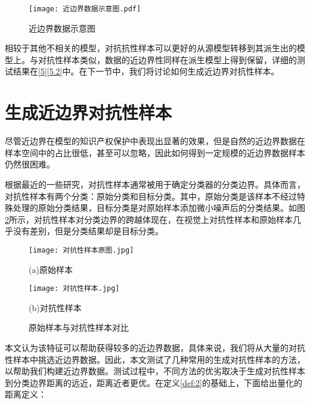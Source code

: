 \begin{figure}[htbp]%
	\centering
	\texttt{[image: 近边界数据示意图.pdf]}
	\setlength{\abovecaptionskip}{5mm} %
	\caption{近边界数据示意图}
	\label{近边界数据示意图}
	\end{figure}
	
相较于其他不相关的模型，对抗抗性样本可以更好的从源模型转移到其派生出的模型上。与对抗性样本类似，数据的近边界性同样在派生模型上得到保留，详细的测试结果在\ref{5}\ref{5.2}中。在下一节中，我们将讨论如何生成近边界对抗性样本。

\section{生成近边界对抗性样本}\label{3.2}

尽管近边界在模型的知识产权保护中表现出显著的效果，但是自然的近边界数据在样本空间中的占比很低，甚至可以忽略，因此如何得到一定规模的近边界数据样本仍然很困难。

根据最近的一些研究\cite{cao2021ipguard}，对抗性样本通常被用于确定分类器的分类边界。具体而言，对抗性样本有两个分类：原始分类和目标分类。其中，原始分类是该样本不经过特殊处理的原始分类结果，目标分类是对原始样本添加微小噪声后的分类结果。如图\ref{原始样本与对抗性样本对比}所示，对抗性样本对分类边界的跨越体现在，在视觉上对抗性样本和原始样本几乎没有差别，但是分类结果却是目标分类。

\begin{figure}[htbp]%
	\begin{minipage}[t]{0.49\linewidth}        %
		\hspace{2mm}
		\centering
		\texttt{[image: 对抗性样本原图.jpg]}
		\centerline{(a)原始样本}
	\end{minipage}
	\begin{minipage}[t]{0.49\linewidth}        %
		\hspace{2mm}
		\centering
		\texttt{[image: 对抗性样本.jpg]}
		\centerline{(b)对抗性样本}
	\end{minipage}
\setlength{\abovecaptionskip}{7mm} %
\caption{原始样本与对抗性样本对比}
\label{原始样本与对抗性样本对比}
\end {figure}


本文认为该特征可以帮助获得较多的近边界数据，具体来说，我们将从大量的对抗性样本中挑选近边界数据。因此，本文测试了几种常用的生成对抗性样本的方法，以帮助我们构建近边界数据。测试过程中，不同方法的优劣取决于生成对抗性样本到分类边界距离的远近，距离近者更优。在定义\ref{def:2}的基础上，下面给出量化的距离定义：

